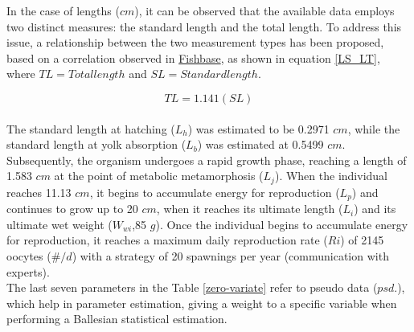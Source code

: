 In the case of lengths ($cm$), it can be observed that the available data employs two distinct measures: the standard length and the total length. To address this issue, a relationship between the two measurement types has been proposed, based on a correlation observed in \href{https://www.fishbase.se/summary/Engraulis-ringens.html}{Fishbase}, as shown in equation \ref{LS_LT}, where $TL = Total length$ and $SL = Standard length$.

\begin{equation}
	TL = 1.141 (SL) 
	\label{LS_LT}
\end{equation}\\

The standard length at hatching ($L_{h}$) was estimated to be 0.2971 $cm$, while the standard length at yolk absorption ($L_{b}$) was estimated at 0.5499 $cm$. Subsequently, the organism undergoes a rapid growth phase, reaching a length of 1.583 $cm$ at the point of metabolic metamorphosis ($L_{j}$). When the individual reaches 11.13 $cm$, it begins to accumulate energy for reproduction ($L_{p}$) and continues to grow up to 20 $cm$, when it reaches its ultimate length ($L_{i}$) and its ultimate wet weight ($W_{wi}$,85 $g$). Once the individual begins to accumulate energy for reproduction, it reaches a maximum daily reproduction rate ($Ri$) of 2145 oocytes ($\#/d$) with a strategy of 20 spawnings per year (communication with experts).\\

The last seven parameters in the Table \ref{zero-variate} refer to pseudo data ($psd.$), which help in parameter estimation, giving a weight to a specific variable when performing a Ballesian statistical estimation.\\

